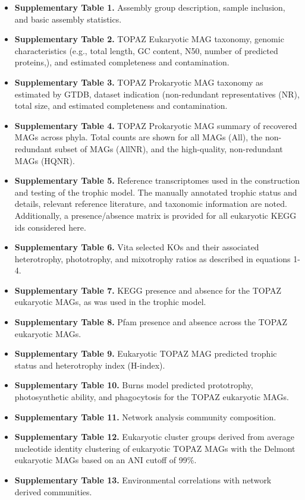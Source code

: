 \documentclass[12pt]{article}
\numberwithin{equation}{section}
\begin{document}
\begin{itemize}
    \item \textbf{Supplementary Table 1.} Assembly group description, sample inclusion, and basic assembly statistics. 
    \item \textbf{Supplementary Table 2.} TOPAZ Eukaryotic MAG taxonomy, genomic characteristics (e.g., total length, GC content, N50, number of predicted proteins,), and estimated completeness and contamination. 
    \item \textbf{Supplementary Table 3.} TOPAZ Prokaryotic MAG taxonomy as estimated by GTDB, dataset indication (non-redundant representatives (NR), total size, and estimated completeness and contamination. 
    \item \textbf{Supplementary Table 4.} TOPAZ Prokaryotic MAG summary of recovered MAGs across phyla. Total counts are shown for all MAGs (All), the non-redundant subset of MAGs (AllNR), and the high-quality, non-redundant MAGs (HQNR). 
    \item \textbf{Supplementary Table 5.} Reference transcriptomes used in the construction and testing of the trophic model. The manually annotated trophic status and details, relevant reference literature, and taxonomic information are noted. Additionally, a presence/absence matrix is provided for all eukaryotic KEGG ids considered here. 
    \item \textbf{Supplementary Table 6.} Vita selected KOs and their associated heterotrophy, phototrophy, and mixotrophy ratios as described in equations 1-4. 
    \item \textbf{Supplementary Table 7.}  KEGG presence and absence for the TOPAZ eukaryotic MAGs, as was used in the trophic model. 
    \item \textbf{Supplementary Table 8.} Pfam presence and absence across the TOPAZ eukaryotic MAGs. 
    \item \textbf{Supplementary Table 9.} Eukaryotic TOPAZ MAG predicted trophic status and heterotrophy index (H-index). 
    \item \textbf{Supplementary Table 10.} Burns model \citep{burns2018gene} predicted prototrophy, photosynthetic ability, and phagocytosis for the TOPAZ eukaryotic MAGs. 
    \item \textbf{Supplementary Table 11.} Network analysis community composition. 
    \item \textbf{Supplementary Table 12.} Eukaryotic cluster groups derived from average nucleotide identity clustering of eukaryotic TOPAZ MAGs with the Delmont eukaryotic MAGs \citep{Delmont_2020} based on an ANI cutoff of 99\%. 
    \item \textbf{Supplementary Table 13.} Environmental correlations with network derived communities. 
\end{itemize}
\end{document}
